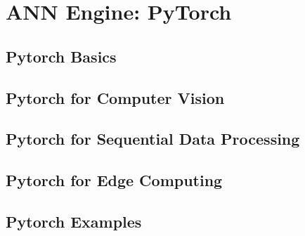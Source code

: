 \chapter{ANN Engine: PyTorch} \label{ch:torch} 

\section{Pytorch Basics}

\section{Pytorch for Computer Vision}

\section{Pytorch for Sequential Data Processing}

\section{Pytorch for Edge Computing}

\section{Pytorch Examples} 